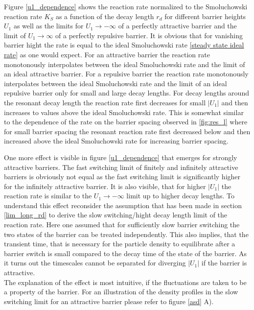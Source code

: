 Figure \ref{u1_dependence} shows the reaction rate normalized to the Smoluchowski reaction rate $K_S$ as a function of the decay length $r_d$ for different barrier heights $U_1$ as well as the limits for $U_1 \rightarrow -\infty$ of a perfectly attractive barrier and the limit of $U_1 \rightarrow \infty$ of a perfectly repulsive barrier.
It is obvious that for vanishing barrier hight the rate is equal to the ideal Smoluchowski rate \eqref{steady state ideal rate} as one would expect. For an attractive barrier the reaction rate monotonously interpolates between the ideal Smoluchowski rate and the limit of an ideal attractive barrier. For a repulsive barrier the reaction rate monotonously interpolates between the ideal Smoluchowski rate and the limit of an ideal repulsive barrier only for small and large decay lengths. For decay lengths around the resonant decay length the reaction rate first decreases for small $|U_1|$ and then increases to values above the ideal Smoluchowski rate. This is somewhat similar to the dependence of the rate on the barrier spacing observed in \ref{fig:res_l} where for small barrier spacing the resonant reaction rate first decreased below and then increased above the ideal Smoluchowski rate for increasing barrier spacing. \par
One more effect is visible in figure \ref{u1_dependence} that emerges for strongly attractive barriers. The fast switching limit of finitely and infinitely attractive barriers is obviously not equal as the fast switching limit is significantly higher for the infinitely attractive barrier. It is also visible, that for higher $|U_1|$ the reaction rate is similar to the $U_1 \rightarrow -\infty$ limit up to higher decay lengths. To understand this effect reconsider the assumption that has been made in section \ref{lim_long_rd} to derive the slow switching/hight decay length limit of the reaction rate. Here one assumed that for sufficiently slow barrier switching the two states of the barrier can be treated independently. This also implies, that the transient time, that is necessary for the particle density to equilibrate after a barrier switch is small compared to the decay time of the state of the barrier. As it turns out the timescales cannot be separated for diverging $|U_1|$ if the barrier is attractive.\\
The explanation of the effect is most intuitive, if the fluctuations are taken to be a property of the barrier. For an illustration of the density profiles in the slow switching limit for an attractive barrier please refer to figure \ref{asd} A). \\
